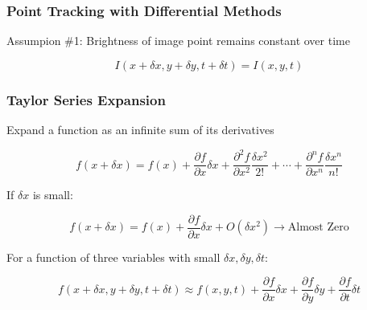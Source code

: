 \begin{frame}
  \frametitle{Point Tracking with Differential Methods}

  \begin{figure}[!h]
    \hspace*{2em}
  \end{figure}

  Assumpion \#1:
  Brightness of image point remains constant over time

  \begin{equation*}
    I(x + \delta x, y + \delta y, t + \delta t) = I(x, y, t)
  \end{equation*}

\end{frame}

\begin{frame}
  \frametitle{Taylor Series Expansion}

  Expand a function as an infinite sum of its derivatives

  \[
  f(x + \delta x) = f(x) + \frac{\partial f}{\partial x}\delta x + 
  \frac{\partial^2 f}{\partial x^2}\frac{\delta x^2}{2!} + \cdots + 
  \frac{\partial^n f}{\partial x^n}\frac{\delta x^n}{n!}
  \]

  If $\delta x$ is small:

  \[
  f(x + \delta x) = f(x) + \frac{\partial f}{\partial x}\delta x + 
  \boxed{O(\delta x^2)} \rightarrow \text{Almost Zero}
  \]

  For a function of three variables with small $\delta x, \delta y, \delta t$:

  \[
  f(x + \delta x, y + \delta y, t + \delta t) \approx f(x, y, t) + 
  \frac{\partial f}{\partial x}\delta x + 
  \frac{\partial f}{\partial y}\delta y + 
  \frac{\partial f}{\partial t}\delta t
  \]
\end{frame}


